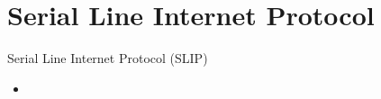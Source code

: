 \section{Serial Line Internet Protocol}
    \begin{frame}{Serial Line Internet Protocol (SLIP)}
        \begin{itemize}
            \item 
        \end{itemize}
    \end{frame}
